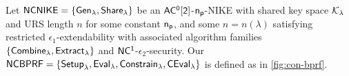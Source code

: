 Let $\mathsf{NCNIKE} = \{{\mathsf{Gen}}_\lambda,{\mathsf{Share}}_\lambda\}$ be an $\mathsf{AC^0[2]}$-$\mathsf{n_p}$-NIKE with shared key space $\mathcal{K}_{\lambda}$ and URS length $n$ for some constant $\mathsf{n_p}$, and some $n = n(\lambda)$ satisfying restricted $\epsilon_1$-extendability with associated algorithm families $\{\mathsf{Combine}_{\lambda},\allowbreak\mathsf{Extract}_{\lambda}\}$ and $\mathsf{NC^1}$-$\epsilon_2$-security.
Our $\mathsf{NCBPRF}=\{\mathsf{Setup}_{\lambda}, \mathsf{Eval}_{\lambda}, \mathsf{Constrain}_{\lambda}, \mathsf{CEval}_{\lambda}\}$ is defined as in \cref{fig:con-bprf}.
